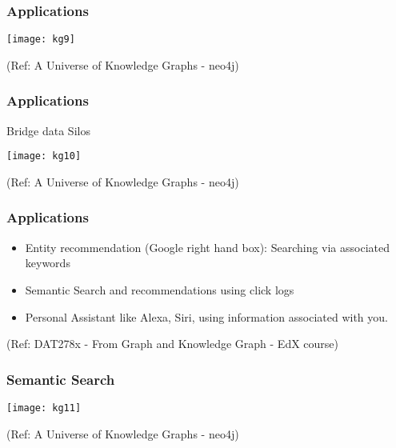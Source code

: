 \begin{frame}[fragile]\frametitle{Applications}
 
 
			\begin{center}
			\texttt{[image: kg9]}
			\end{center}	
			
			{\tiny (Ref: A Universe of Knowledge Graphs - neo4j)}
		
	
\end{frame}

\begin{frame}[fragile]\frametitle{Applications}
 
 Bridge data Silos
 
			\begin{center}
			\texttt{[image: kg10]}
			\end{center}	
			
			{\tiny (Ref: A Universe of Knowledge Graphs - neo4j)}
		
	
\end{frame}



\begin{frame}\frametitle{Applications}

\begin{itemize}
\item Entity recommendation (Google right hand box): Searching via associated keywords
\item Semantic Search and recommendations using click logs
\item Personal Assistant like Alexa, Siri, using information associated with you.
\end{itemize}

{\tiny (Ref: DAT278x - From Graph and Knowledge Graph - EdX course)}
\end{frame}


\begin{frame}[fragile]\frametitle{Semantic Search}
 
 
			\begin{center}
			\texttt{[image: kg11]}
			\end{center}	
			
			{\tiny (Ref: A Universe of Knowledge Graphs - neo4j)}
		
	
\end{frame}

